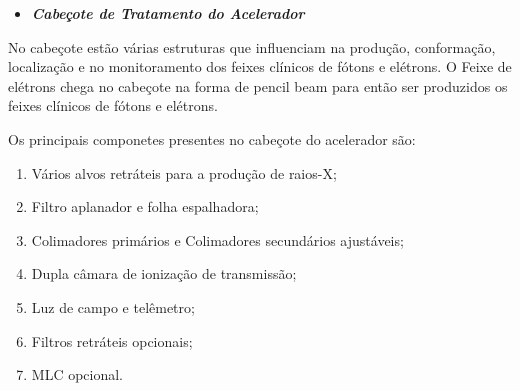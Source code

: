 \documentclass[11pt,a4paper]{article}
\begin{document}
                \begin{itemize}
                    \item \textbf{\textit{\textcolor{CarnationPink}{Cabeçote de Tratamento do Acelerador}}}
                \end{itemize}

    No cabeçote estão várias estruturas que influenciam na produção, conformação, localização e no monitoramento dos feixes clínicos de fótons e elétrons. O Feixe de elétrons chega no cabeçote na forma de pencil beam para então ser produzidos os feixes clínicos de fótons e elétrons. 

    Os principais componetes presentes no cabeçote do acelerador são:

    \begin{enumerate}
		\item Vários alvos retráteis para a produção de raios-X;
		\item Filtro aplanador e folha espalhadora;
		\item Colimadores primários e Colimadores secundários ajustáveis;
		\item Dupla câmara de ionização de transmissão;
		\item Luz de campo e telêmetro;
		\item Filtros retráteis opcionais;
		\item MLC opcional.
	\end{enumerate}                
\end{document}
